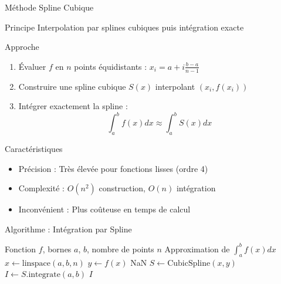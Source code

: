 \documentclass[aspectratio=169,11pt]{beamer}
\begin{document}
\begin{frame}{Méthode Spline Cubique}
\vspace{-0.2cm}
\begin{block}{Principe}
\small Interpolation par splines cubiques puis intégration exacte
\end{block}

\vspace{-0.15cm}
\begin{block}{Approche}
\small
\begin{enumerate}
\item Évaluer $f$ en $n$ points équidistants : $x_i = a + i\frac{b-a}{n-1}$
\item Construire une spline cubique $S(x)$ interpolant $(x_i, f(x_i))$
\item Intégrer exactement la spline :
\begin{equation}
\int_a^b f(x) dx \approx \int_a^b S(x) dx
\end{equation}
\end{enumerate}
\end{block}

\vspace{-0.15cm}
\begin{block}{Caractéristiques}
\small
\begin{itemize}
\item Précision : Très élevée pour fonctions lisses (ordre 4)
\item Complexité : $O(n^2)$ construction, $O(n)$ intégration
\item Inconvénient : Plus coûteuse en temps de calcul
\end{itemize}
\end{block}
\end{frame}

\begin{frame}{Algorithme : Intégration par Spline}
\vspace{-0.3cm}
\begin{algorithm}[H]
\caption{Intégration par Spline Cubique}
\small
\begin{algorithmic}[1]
\REQUIRE Fonction $f$, bornes $a$, $b$, nombre de points $n$
\ENSURE Approximation de $\int_a^b f(x) dx$
\STATE $x \leftarrow \text{linspace}(a, b, n)$ 
\STATE $y \leftarrow f(x)$ 
    \RETURN NaN 
\ENDIF
\STATE $S \leftarrow \text{CubicSpline}(x, y)$ 
\STATE $I \leftarrow S.\text{integrate}(a, b)$ 
\RETURN $I$
\end{algorithmic}
\end{algorithm}
\end{frame}
\end{document}
